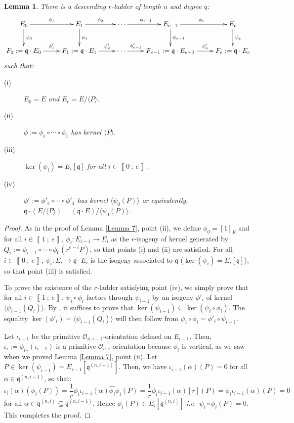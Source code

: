 \documentclass[a4paper,10pt]{report}
\theoremstyle{definition}
\theoremstyle{plain}
\newtheorem{Lemma}[Definition]{Lemma}
\theoremstyle{definition}
\newcommand{\ie}{\emph{i.e.}\ }
\newcommand{\mO}{\mathcal{O}}
\renewcommand{\i}[2]{\left\llbracket #1~;~#2\right\rrbracket}
\renewcommand{\(}{\left(}
\renewcommand{\)}{\right)}
\newcommand{\mf}[1]{\mathfrak{#1}}
\begin{document}
\begin{Lemma}\label{Lemma 8}
There is a descending $r$-ladder of length $n$ and degree $q$:
\[\xymatrix{
E_0 \ar[d]^{\psi_0} \ar[r]^{\phi_1} & E_1\ar[d]^{\psi_1} \ar[r]^{\phi_{2}}& \cdots \ar[r]^{\phi_{e-1}} & E_{e-1} \ar[d]^{\psi_{e-1}} \ar[r]^{\phi_{e}} & E_e \ar[d]^{\psi_e}\\
F_0:=\mf{q}\cdot E_0 \ar[r]^-{\phi'_1} & F_1:=\mf{q}\cdot E_1 \ar[r]^-{\phi'_{2}}& \cdots \ar[r]^-{\phi'_{e-1}} & F_{e-1}:=\mf{q}\cdot E_{e-1} \ar[r]^-{\phi'_{e}} & F_e:=\mf{q}\cdot E_e
}\]
such that: 
\begin{description}
\item[(i)] $E_0=E$ and $E_e=E/\langle P\rangle$.
\item[(ii)] $\phi:=\phi_e\circ\cdots\circ\phi_1$ has kernel $\langle P\rangle$.
\item[(iii)] $\ker(\psi_i)=E_i[\mf{q}]$ for all $i\in\i{0}{e}$.
\item[(iv)] $\phi':=\phi'_e\circ\cdots\circ\phi'_1$ has kernel $\langle \psi_0(P)\rangle$ or equivalently, $\mf{q}\cdot(E/\langle P\rangle)=(\mf{q}\cdot E)/\langle \psi_0(P)\rangle$.
\end{description}
\end{Lemma}

\begin{proof}
As in the proof of Lemma \ref{Lemma 7}, point (ii), we define $\phi_0=[1]_E$ and for all $i\in\i{1}{e}$, $\phi_i :E_{i-1}\longrightarrow E_i$ as the $r$-isogeny of kernel generated by $Q_i:=\phi_{i-1}\circ\cdots\circ\phi_0(r^{e-i}P)$, so that points (i) and (ii) are satisfied. For all $i\in\i{0}{e}$, $\psi_i:E_i\longrightarrow \mf{q}\cdot E_i$ is the isogeny associated to $\mf{q}$ ($\ker(\psi_i)=E_i[\mf{q}]$), so that point (iii) is satisfied. 

To prove the existence of the $r$-ladder satisfying point (iv), we simply prove that for all $i\in\i{1}{e}$, $\psi_i\circ\phi_i$ factors through $\psi_{i-1}$ by an isogeny $\phi'_i$ of kernel $\langle \psi_{i-1}(Q_i)\rangle$.  By \cite[Corollary III.4.11]{Silverman1}, it suffices to prove that $\ker(\psi_{i-1})\subseteq \ker(\psi_i\circ\phi_i)$. The equality $\ker(\phi'_i)=\langle \psi_{i-1}(Q_i)\rangle$ will then follow from $\psi_i\circ\phi_i=\phi'_i\circ\psi_{i-1}$. 

Let $\iota_{i-1}$ be the primitive $\mO_{n,i-1}$-orientation defined on $E_{i-1}$. Then, $\iota_i:={\phi_{i}}_{*}(\iota_{i-1})$ is a primitive $\mO_{n,i}$-orientation because $\phi_{i}$ is vertical, as we saw when we proved Lemma \ref{Lemma 7}, point (ii). Let $P\in\ker(\psi_{i-1})=E_{i-1}[\mf{q}^{(n,i-1)}]$. Then, we have $\iota_{i-1}(\alpha)(P)=0$ for all $\alpha\in\mf{q}^{(n,i-1)}$, so that:
\[\iota_{i}(\alpha)(\phi_i(P))=\frac{1}{r}\phi_i\iota_{i-1}(\alpha)\widehat{\phi_i}\phi_i(P)=\frac{1}{r}\phi_i\iota_{i-1}(\alpha)[r](P)=\phi_i\iota_{i-1}(\alpha)(P)=0\]
for all $\alpha\in \mf{q}^{(n,i)}\subseteq \mf{q}^{(n,i-1)}$. Hence $\phi_i(P)\in E_i[ \mf{q}^{(n,i)}]$ \ie $\psi_i\circ\phi_i(P)=0$. This completes the proof.
\end{proof}
\end{document}
